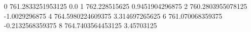 0 761.2833251953125 0.0
1 762.228515625 0.9451904296875
2 760.2803955078125 -1.0029296875
4 764.5980224609375 3.314697265625
6 761.070068359375 -0.2132568359375
8 764.7403564453125 3.45703125
